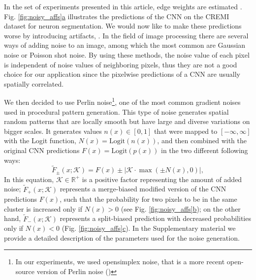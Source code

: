  In the set of experiments presented in this article, edge weights are estimated . Fig. \hyperref[fig:noisy_affs]{\ref*{fig:noisy_affs}a} illustrates the predictions of the CNN on the CREMI dataset for neuron segmentation. We would now like to make these predictions worse by introducing  artifacts, . In the field of image processing there are several ways of adding noise to an image, among which the most common are Gaussian noise or Poisson shot noise. By using these methods, the noise value of each pixel is independent of noise values of neighboring pixels, thus they are not a good choice for our application since the pixelwise predictions of a CNN are usually spatially correlated. 

 We then decided to use Perlin noise\footnote{In our experiments, we used opensimplex noise, that is a more recent open-source version of Perlin noise ()}, one of the most common gradient noises used in procedural pattern generation. This type of noise generates spatial random patterns that are locally smooth but have large and diverse variations on bigger scales. It generates values $n(x)\in[0,1]$ that were mapped to $[-\infty, \infty]$ with the Logit function, $N(x)=\mathrm{Logit}(n(x))$, and then combined with the original CNN predictions $F(x)=\mathrm{Logit}(p(x))$ in the two different following ways:
\begin{equation}
\tilde{F}_{\pm}(x;\mathcal{K})=F(x)\pm\big|\mathcal{K}\cdot\max\left(\pm N(x),0\right)\big|,
\end{equation}
In this equation, $\mathcal{K}\in \mathbb{R}^+$ is a positive factor representing the amount of added noise; $\tilde{F}_{+}(x;\mathcal{K})$ represents a merge-biased modified version of the CNN predictions $F(x)$, such that the probability for two pixels to be in the same cluster is increased only if $N(x)>0$ (see Fig. \hyperref[fig:noisy_affs]{\ref*{fig:noisy_affs}b}); on the other hand, $\tilde{F}_{-}(x;\mathcal{K})$ represents a split-biased prediction with decreased probabilities only if $N(x)<0$ (Fig. \hyperref[fig:noisy_affs]{\ref*{fig:noisy_affs}c}). In the Supplementary material we provide a detailed description of the parameters used for the noise generation.

